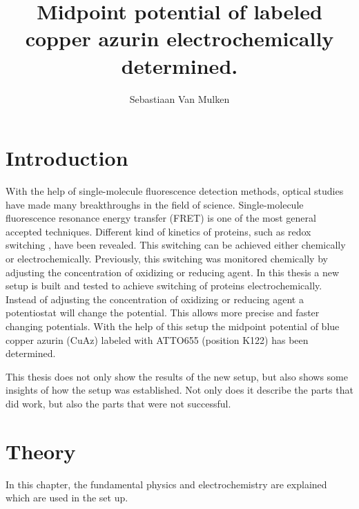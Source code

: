 \documentclass[twoside,single]{lion-msc}
\title{Midpoint potential of labeled copper azurin electrochemically determined.}
\author{Sebastiaan Van Mulken}
\begin{document}
\maketitle



\chapter{Introduction}
With the help of single-molecule fluorescence detection methods, optical studies have made many breakthroughs in the field of science. Single-molecule fluorescence resonance energy transfer (FRET) is one of the most general accepted techniques. Different kind of kinetics of proteins, such as redox switching \cite{Akklc}, have been revealed. This switching can be achieved either chemically or electrochemically. Previously, this switching was monitored chemically by adjusting the concentration of oxidizing or reducing agent. In this thesis a new setup is built and tested to achieve switching of proteins electrochemically. Instead of adjusting the concentration of oxidizing or reducing agent a potentiostat will change the potential. This allows more precise and faster changing potentials. With the help of this setup the midpoint potential of blue copper azurin (CuAz) labeled with ATTO655 (position K122) has been determined. 

This thesis does not only show the results of the new setup, but also shows some insights of how the setup was established. Not only does it describe the parts that did work, but also the parts that were not successful. 


\chapter{Theory}
In this chapter, the fundamental physics and electrochemistry are explained which are used in the set up.
\end{document}

